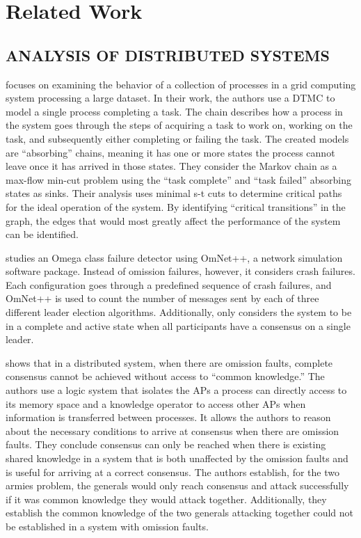 

\chapter{Related Work}

\section{ANALYSIS OF DISTRIBUTED SYSTEMS}

\cite{markov-distributed} focuses on examining the behavior of a collection of processes in a grid computing system processing a large dataset.
In their work, the authors use a \ac{DTMC} to model a single process completing a task.
The chain describes how a process in the system goes through the steps of acquiring a task to work on, working on the task, and subsequently either completing or failing the task.
The created models are ``absorbing'' chains, meaning it has one or more states the process cannot leave once it has arrived in those states.
They consider the Markov chain as a max-flow min-cut problem using the ``task complete'' and ``task failed'' absorbing states as sinks.
Their analysis uses minimal s-t cuts to determine critical paths for the ideal operation of the system.
By identifying ``critical transitions'' in the graph, the edges that would most greatly affect the performance of the system can be identified.

\cite{LEADERELECTIONEVAL} studies an Omega class failure detector using OmNet++\cite{OMNET}, a network simulation software package.
Instead of omission failures, however, it considers crash failures.
Each configuration goes through a predefined sequence of crash failures, and OmNet++ is used to count the number of messages sent by each of three different leader election algorithms.
Additionally, \cite{LEADERELECTIONEVAL} only considers the system to be in a complete and active state when all participants have a consensus on a single leader.

\cite{knowledge-distributed} shows that in a distributed system, when there are omission faults, complete consensus cannot be achieved without access to ``common knowledge.''
The authors use a logic system that isolates the \acp{AP} a process can directly access to its memory space and a knowledge operator to access other \acp{AP} when information is transferred between processes.
It allows the authors to reason about the necessary conditions to arrive at consensus when there are omission faults.
They conclude consensus can only be reached when there is existing shared knowledge in a system that is both unaffected by the omission faults and is useful for arriving at a correct consensus.
The authors establish, for the two armies problem, the generals would only reach consensus and attack successfully if it was common knowledge they would attack together.
Additionally, they establish the common knowledge of the two generals attacking together could not be established in a system with omission faults.


